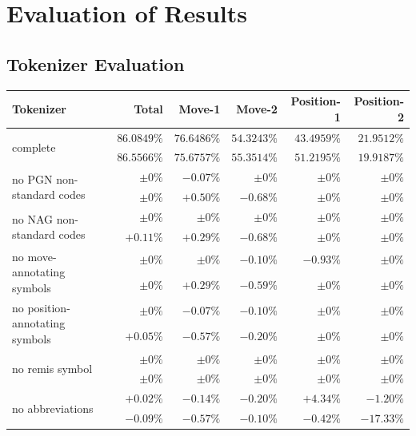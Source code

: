 \documentclass[article,type=msc,colorback,accentcolor=tud7b]{tudthesis}
\begin{document}
  \section{Evaluation of Results}
  \label{sec:evaluation_of_results}
  
  \subsection{Tokenizer Evaluation}    
  \label{subsec:tokenizer_evaluation}

	\begin{table}[H]
      \begin{tabular}{| l | r | r | r | r | r |}
    	\hline
    	Tokenizer & Total & Move-1 & Move-2 & Position-1 & Position-2 \\ \hline
	    \multirow{2}{*}{complete} & $86.0849\%$ & $76.6486\%$ & $54.3243\%$ & $43.4959\%$ & $21.9512\%$ \\	
	    & $86.5566\%$ & $75.6757\%$ & $55.3514\%$ & $51.2195\%$ & $19.9187\%$ \\ \hline
	    \multirow{2}{*}{no PGN non-standard codes} & $\pm0\%$ & $-0.07\%$ & $\pm0\%$ & $\pm0\%$ & $\pm0\%$ \\	
	    & $\pm0\%$ & $+0.50\%$ & $-0.68\%$ & $\pm0\%$ & $\pm0\%$ \\ \hline
	    \multirow{2}{*}{no NAG non-standard codes} & $\pm0\%$ & $\pm0\%$ & $\pm0\%$ & $\pm0\%$ & $\pm0\%$ \\	
	    & $+0.11\%$ & $+0.29\%$ & $-0.68\%$ & $\pm0\%$ & $\pm0\%$ \\ \hline
	    \multirow{2}{*}{no move-annotating symbols} & $\pm0\%$ & $\pm0\%$ & $-0.10\%$ & $-0.93\%$ & $\pm0\%$ \\	
	    & $\pm0\%$ & $+0.29\%$ & $-0.59\%$ & $\pm0\%$ & $\pm0\%$ \\ \hline
	    \multirow{2}{*}{no position-annotating symbols} & $\pm0\%$ & $-0.07\%$ & $-0.10\%$ & $\pm0\%$ & $\pm0\%$ \\	
	    & $+0.05\%$ & $-0.57\%$ & $-0.20\%$ & $\pm0\%$ & $\pm0\%$ \\ \hline
	    \multirow{2}{*}{no remis symbol} & $\pm0\%$ & $\pm0\%$ & $\pm0\%$ & $\pm0\%$ & $\pm0\%$ \\	
	    & $\pm0\%$ & $\pm0\%$ & $\pm0\%$ & $\pm0\%$ & $\pm0\%$ \\ \hline
	    \multirow{2}{*}{no abbreviations} & $+0.02\%$ & $-0.14\%$ & $-0.20\%$ & $+4.34\%$ & $-1.20\%$ \\	
	    & $-0.09\%$ & $-0.57\%$ & $-0.10\%$ & $-0.42\%$ & $-17.33\%$ \\ \hline

\end{tabular}
\end{table}
\end{document}
